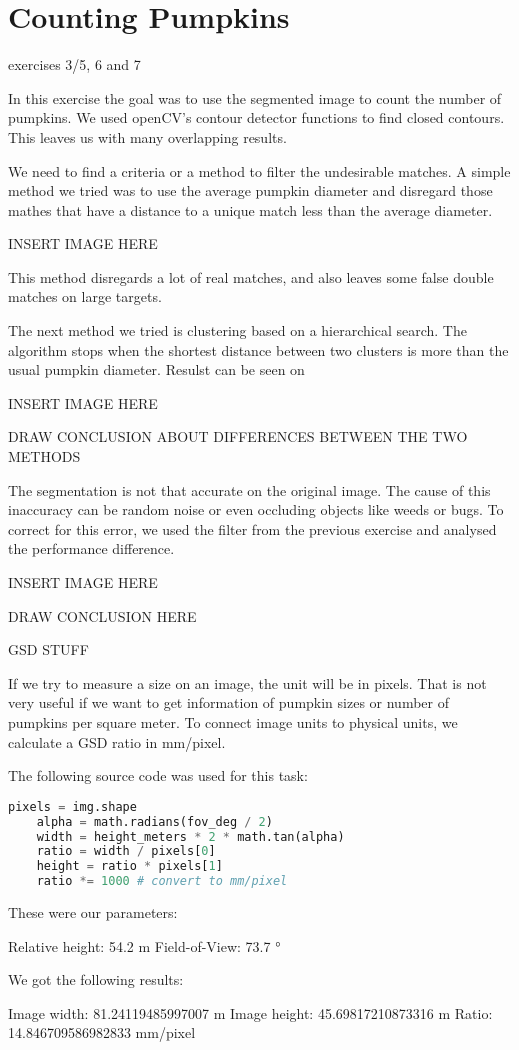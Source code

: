 \documentclass[../Head/Main.tex]{subfiles}
\begin{document}
\section{Counting Pumpkins}
exercises 3/5, 6 and 7

In this exercise the goal was to use the segmented image to count the number of pumpkins. We used openCV's contour detector functions to find closed contours. This leaves us with many overlapping results.

We need to find a criteria or a method to filter the undesirable matches. A simple method we tried was to use the average pumpkin diameter and disregard those mathes that have a distance to a unique match less than the average diameter.

INSERT IMAGE HERE

This method disregards a lot of real matches, and also leaves some false double matches on large targets.

The next method we tried is clustering based on a hierarchical search. The algorithm stops when the shortest distance between two clusters is more than the usual pumpkin diameter. Resulst can be seen on

INSERT IMAGE HERE

DRAW CONCLUSION ABOUT DIFFERENCES BETWEEN THE TWO METHODS

The segmentation is not that accurate on the original image. The cause of this inaccuracy can be random noise or even occluding objects like weeds or bugs. To correct for this error, we used the filter from the previous exercise and analysed the performance difference.

INSERT IMAGE HERE

DRAW CONCLUSION HERE

GSD STUFF

If we try to measure a size on an image, the unit will be in pixels. That is not very useful if we want to get information of pumpkin sizes or number of pumpkins per square meter. To connect image units to physical units, we calculate a GSD ratio in mm/pixel.

The following source code was used for this task:

\begin{lstlisting}[language=Python]
    pixels = img.shape
    alpha = math.radians(fov_deg / 2)
    width = height_meters * 2 * math.tan(alpha)
    ratio = width / pixels[0]
    height = ratio * pixels[1]
    ratio *= 1000 # convert to mm/pixel
\end{lstlisting}

These were our parameters:

Relative height: 54.2 m
Field-of-View: 73.7 °


We got the following results:

Image width: 81.24119485997007 m
Image height: 45.69817210873316 m
Ratio: 14.846709586982833 mm/pixel
\end{document}
